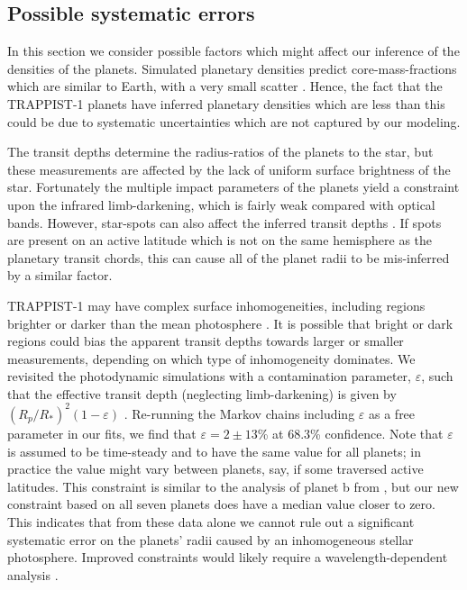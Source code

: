 \documentclass[twocolumn]{aastex63}
\begin{document}
\subsection{Possible systematic errors}

In this section we consider possible factors which might affect our
inference of the densities of the planets.  Simulated planetary
densities predict core-mass-fractions which are similar to
Earth, with a very small scatter \citep{Scora2020}.  Hence, the
fact that the TRAPPIST-1 planets have inferred planetary densities
which are less than this could be due to systematic uncertainties
which are not captured by our modeling.

The transit depths
determine the radius-ratios of the planets to the star, but these
measurements are affected by the lack of uniform surface brightness
of the star.  Fortunately the multiple impact parameters of the
planets yield a constraint upon the infrared limb-darkening, which
is fairly weak compared with optical bands.  However, star-spots
can also affect the inferred transit depths \citep{Rackham2018,
    Kipping2012b}.  If spots are present on an active latitude
which is not on the same hemisphere as the planetary transit chords,
this can cause all of the planet radii to be mis-inferred by a similar
factor.

TRAPPIST-1 may have complex surface inhomogeneities, including regions brighter or darker than the mean photosphere  \citep{Morris2018d,Wakeford2019}. It is possible that bright or dark regions could bias the apparent transit depths towards larger or smaller measurements, depending on which type of inhomogeneity dominates. We revisited the photodynamic simulations with a contamination parameter,
$\varepsilon$, such that the effective transit depth (neglecting limb-darkening) is given by $(R_p/R_*)^2(1-\varepsilon)$
\citep{Morris2018b,Morris2018c}.  Re-running the Markov chains
including $\varepsilon$ as a free parameter in our fits, we
find that $\varepsilon = 2\pm 13$\% at 68.3\% confidence.  Note that $\varepsilon$ is assumed to be time-steady and to have the same value for all planets; in practice the value might vary between planets, say, if some traversed active latitudes.
This constraint is similar to the analysis of planet b from \citet{Morris2018c}, but our new constraint based on all seven planets does have a median value closer to zero.
This indicates that from these data alone we cannot rule out a significant systematic error on the planets' radii caused by an inhomogeneous stellar photosphere.
Improved constraints would likely require a wavelength-dependent analysis \citep[e.g.][]{Rackham2018,Wakeford2019}.
\end{document}

